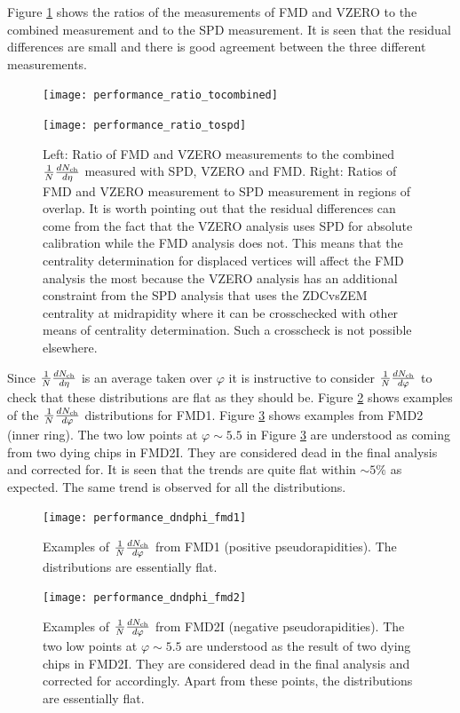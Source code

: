 \documentclass[11pt]{article}
\begin{document}
Figure \ref{ratiofmdvzero} shows the ratios of the measurements of FMD
and VZERO to the combined measurement and to the SPD measurement. It
is seen that the residual differences are small and there is good
agreement between the three different measurements.
\begin{figure}
  \centering
  \begin{minipage}{0.5\linewidth}
    \centering
    \texttt{[image: performance\_ratio\_tocombined]}
  \end{minipage}%
  \begin{minipage}{0.5\linewidth}
    \centering
    \texttt{[image: performance\_ratio\_tospd]}
  \end{minipage}%
  \caption{Left: Ratio of FMD and VZERO measurements to the combined
    $\dndeta$ measured with SPD, VZERO and FMD. Right: Ratios of FMD
    and VZERO measurement to SPD measurement in regions of
    overlap. It is worth pointing out that the residual differences
    can come from the fact that the VZERO analysis uses SPD for
    absolute calibration while the FMD analysis does not. This means that the
    centrality determination for displaced vertices will affect the
    FMD analysis the most because the VZERO analysis has an additional
  constraint from the SPD analysis that uses the ZDCvsZEM centrality
  at midrapidity where it can be crosschecked with other means of
  centrality determination. Such a crosscheck is not possible elsewhere.}
  \label{ratiofmdvzero}
\end{figure} 

Since $\dndeta$ is an average taken over $\varphi$ it is instructive
to consider $\dndphi$ to check that these distributions are flat as
they should be. Figure \ref{dndphi_pos} shows examples of the
$\dndphi$ distributions for FMD1. Figure \ref{dndphi_neg} shows
examples from FMD2 (inner ring). The two low points at $\varphi \sim
5.5$ in Figure \ref{dndphi_neg} are understood as coming from two
dying chips in FMD2I. They are considered dead in the final analysis
and corrected for. It is seen that the trends are quite flat within
$\sim 5\%$ as expected. The same trend is observed for all the
distributions.

\begin{figure}
  \centering
  \texttt{[image: performance\_dndphi\_fmd1]}
  \caption{Examples of $\dndphi$ from FMD1 (positive
    pseudorapidities). The distributions are essentially flat.}
  \label{dndphi_pos}
\end{figure} 

\begin{figure}
  \centering
  \texttt{[image: performance\_dndphi\_fmd2]}
  \caption{Examples of $\dndphi$ from FMD2I (negative
    pseudorapidities). The two low points at $\varphi \sim 5.5$ are
    understood as the result of two dying chips in FMD2I. They are
    considered dead in the final analysis and corrected for
    accordingly. Apart from these points, the distributions are
    essentially flat.}
  \label{dndphi_neg}
\end{figure} 
\end{document}

